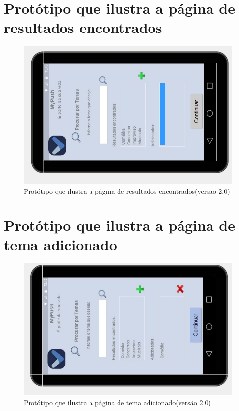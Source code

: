 \begin{apendicesenv}
      \section*{Protótipo que ilustra a página de resultados encontrados}

    \begin{figure}[!htbp]
      \centering
      \includegraphics[scale=0.5, angle=-90]{editaveis/figuras/prototipo_alta_fidelidade_v2/2_3}
      \caption{Protótipo que ilustra a página de resultados encontrados(versão 2.0)}
      \label{v2}
    \end{figure}
    
      \section*{Protótipo que ilustra a página de tema adicionado}

    \begin{figure}[!htbp]
      \centering
      \includegraphics[scale=0.5, angle=-90]{editaveis/figuras/prototipo_alta_fidelidade_v2/2_4}
      \caption{Protótipo que ilustra a página de tema adicionado(versão 2.0)}
      \label{v2}
    \end{figure}
    

\end{apendicesenv}
